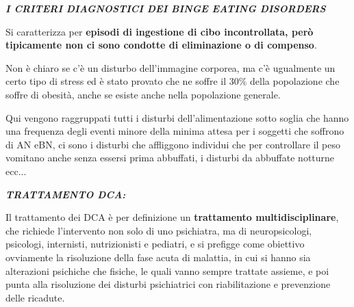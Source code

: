 \documentclass[]{article}
\begin{document}
\textbf{\emph{I CRITERI DIAGNOSTICI DEI BINGE EATING DISORDERS}}

Si caratterizza per \textbf{episodi di ingestione di cibo incontrollata,
però tipicamente non ci sono condotte di eliminazione o di compenso}.

Non è chiaro se c'è un disturbo dell'immagine corporea, ma c'è
ugualmente un certo tipo di stress ed è stato provato che ne soffre il
30\% della popolazione che soffre di obesità, anche se esiste anche
nella popolazione generale.

Qui vengono raggruppati tutti i disturbi dell'alimentazione sotto soglia
che hanno una frequenza degli eventi minore della minima attesa per i
soggetti che soffrono di AN eBN, ci sono i disturbi che affliggono
individui che per controllare il peso vomitano anche senza essersi prima
abbuffati, i disturbi da abbuffate notturne ecc...

\textbf{\emph{TRATTAMENTO DCA:}}

Il trattamento dei DCA è per definizione un \textbf{trattamento
multidisciplinare}, che richiede l'intervento non solo di uno
psichiatra, ma di neuropsicologi, psicologi, internisti, nutrizionisti e
pediatri, e si prefigge come obiettivo ovviamente la risoluzione della
fase acuta di malattia, in cui si hanno sia alterazioni psichiche che
fisiche, le quali vanno sempre trattate assieme, e poi punta alla
risoluzione dei disturbi psichiatrici con riabilitazione e prevenzione
delle ricadute.
\end{document}
